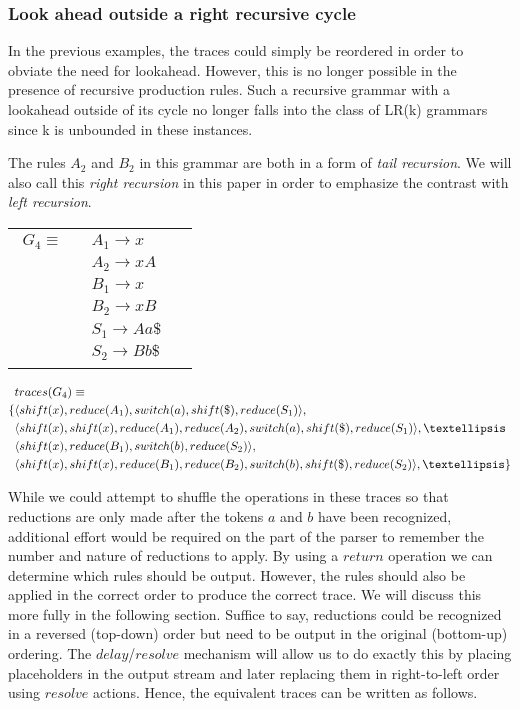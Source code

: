 \documentclass[a4paper,11pt]{article}
\begin{document}
\subsubsection{Look ahead outside a right recursive cycle}
In the previous examples, the traces could simply be reordered in order to obviate the need for lookahead. However, this is no longer possible in the presence of recursive production rules.
Such a recursive grammar with a lookahead outside of its cycle no longer falls into the class of LR(k) grammars since k is unbounded in these instances.

The rules $A_2$ and $B_2$ in this grammar are both in a form of \emph{tail recursion}. 
We will also call this \emph{right recursion} in this paper in order to emphasize the contrast with \emph{left recursion}.

\begin{tabular}[t]{cl}
\parbox{.3\textwidth}{
\begin{align*}
G_4 \equiv \quad & A_1 \rightarrow x\\
                 & A_2 \rightarrow x A\\
                 & B_1 \rightarrow x\\
                 & B_2 \rightarrow x B\\
                 & S_1 \rightarrow A a \$\\
                 & S_2 \rightarrow B b \$
\end{align*}}
\parbox{.6\textwidth}{}
\end{tabular}

{\small\parbox{.3\textwidth}{\begin{align*}
&traces(G_4) \equiv \\
\{ & \langle shift(x), reduce(A_1), switch(a), shift(\$), reduce(S_1) \rangle,\\
   & \langle shift(x), shift(x), reduce(A_1), reduce(A_2), switch(a), shift(\$), reduce(S_1) \rangle, \textellipsis \\
   & \langle shift(x), reduce(B_1), switch(b), reduce(S_2) \rangle,\\
   & \langle shift(x), shift(x), reduce(B_1), reduce(B_2), switch(b), shift(\$), reduce(S_2) \rangle, \textellipsis \}
\end{align*}}}

While we could attempt to shuffle the operations in these traces so that reductions are only made after the tokens $a$ and $b$ have been recognized, 
additional effort would be required on the part of the parser to remember the number and nature of reductions to apply. 
By using a $return$ operation we can determine which rules should be output. However, the rules should also be applied in the correct order to produce the correct trace. 
We will discuss this more fully in the following section.
Suffice to say, reductions could be recognized in a reversed (top-down) order but need to be output in the original (bottom-up) ordering.
The $delay$/$resolve$ mechanism will allow us to do exactly this by placing placeholders in the output stream and later replacing them in right-to-left order using $resolve$ actions.
Hence, the equivalent traces can be written as follows.
\end{document}
